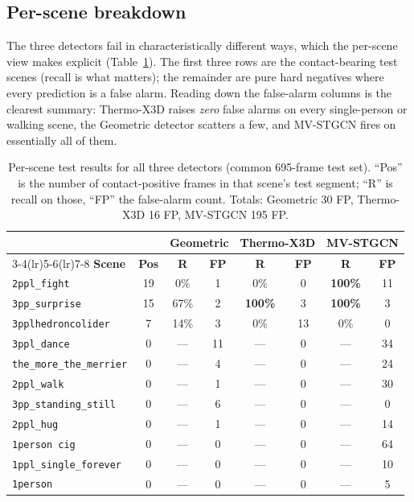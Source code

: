 \documentclass[11pt, a4paper]{article}
\begin{document}
\subsection{Per-scene breakdown}

The three detectors fail in characteristically different ways, which the
per-scene view makes explicit (Table~\ref{tab:perscene}). The first three rows
are the contact-bearing test scenes (recall is what matters); the remainder are
pure hard negatives where every prediction is a false alarm. Reading down the
false-alarm columns is the clearest summary: Thermo-X3D raises \emph{zero} false
alarms on every single-person or walking scene, the Geometric detector
scatters a few, and MV-STGCN fires on essentially all of them.

\begin{table}[H]
\centering
\caption{Per-scene test results for all three detectors (common 695-frame test
set). ``Pos'' is the number of contact-positive frames in that scene's test
segment; ``R'' is recall on those, ``FP'' the false-alarm count. Totals:
Geometric 30 FP, Thermo-X3D 16 FP, MV-STGCN 195 FP.}
\label{tab:perscene}
\renewcommand{\arraystretch}{1.3}
\begin{tabular}{lc cc cc cc}
\toprule
& & \multicolumn{2}{c}{\textbf{Geometric}} & \multicolumn{2}{c}{\textbf{Thermo-X3D}}
    & \multicolumn{2}{c}{\textbf{MV-STGCN}} \\
\cmidrule(lr){3-4}\cmidrule(lr){5-6}\cmidrule(lr){7-8}
\textbf{Scene} & \textbf{Pos} & \textbf{R} & \textbf{FP}
    & \textbf{R} & \textbf{FP} & \textbf{R} & \textbf{FP} \\
\midrule
\texttt{2ppl\_fight}        & 19 & 0\%   & 1  & 0\%   & 0  & \textbf{100\%} & 11 \\
\texttt{3pp\_surprise}      & 15 & 67\%  & 2  & \textbf{100\%} & 3  & \textbf{100\%} & 3 \\
\texttt{3pplhedroncolider}  &  7 & 14\%  & 3  & 0\%   & 13 & 0\%   & 0 \\
\midrule
\texttt{3ppl\_dance}        &  0 & ---   & 11 & ---   & 0  & ---   & 34 \\
\texttt{the\_more\_the\_merrier} & 0 & --- & 4 & ---  & 0  & ---   & 24 \\
\texttt{2ppl\_walk}         &  0 & ---   & 1  & ---   & 0  & ---   & 30 \\
\texttt{3pp\_standing\_still} & 0 & ---   & 6  & ---   & 0  & ---   & 0  \\
\texttt{2ppl\_hug}          &  0 & ---   & 1  & ---   & 0  & ---   & 14 \\
\texttt{1person cig}        &  0 & ---   & 0  & ---   & 0  & ---   & 64 \\
\texttt{1ppl\_single\_forever}   & 0 & --- & 0 & ---  & 0  & ---   & 10 \\
\texttt{1person}            &  0 & ---   & 0  & ---   & 0  & ---   & 5  \\
\bottomrule
\end{tabular}
\end{table}
\end{document}

